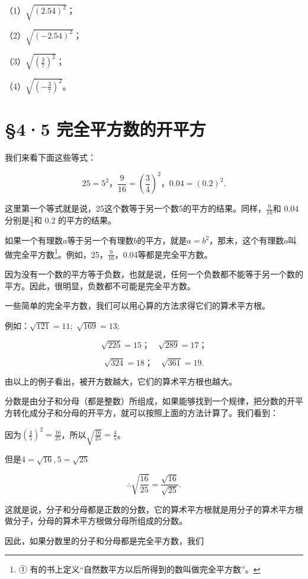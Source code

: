 （1）\(\sqrt{(2.54)^2}\)；

（2）\(\sqrt{(-2.54)^2}\)；

（3）\(\sqrt{\left(\frac{3}{7}\right)^2}\)；

（4）\(\sqrt{\left(-\frac{3}{7}\right)^2}\)。

\section{§4·5 完全平方数的开平方}

我们来看下面这些等式：

\[
25 = 5 ^ {2}\text{，} \frac{9}{16} = \left(\frac{3}{4}\right) ^ {2}\text{，} 0.04 = (0.2) ^ {2}.
\]

这里第一个等式就是说，25这个数等于另一个数5的平方的结果。同样，\(\frac{9}{16}\)和
0.04 分别是\(\frac{3}{4}\)和 0.2 的平方的结果。

如果一个有理数\(a\)等于另一个有理数\(b\)的平方，就是\(a = b^2\)，那末，这个有理数\(a\)叫做完全平方数\footnote{①
  有的书上定义``自然数平方以后所得到的数叫做完全平方数''。}。例如，25，\(\frac{9}{16}\)，0.04等都是完全平方数。

因为没有一个数的平方等于负数，也就是说，任何一个负数都不能等于另一个数的平方。因此，很明显，负数都不可能是完全平方数。

一些简单的完全平方数，我们可以用心算的方法求得它们的算术平方根。

例如：\(\sqrt{121} = 11;\) \(\sqrt{169} = 13;\)

\[
\sqrt {225} = 15\text{；} \quad \sqrt {289} = 17\text{；}
\]

\[
\sqrt {324} = 18\text{；} \quad \sqrt {361} = 19.
\]

由以上的例子看出，被开方数越大，它们的算术平方根也越大。

分数是由分子和分母（都是整数）所组成，如果能够找到一个规律，把分数的开平方转化成分子和分母的开平方，就可以按照上面的方法计算了。我们看到：

因为\(\left(\frac{4}{5}\right)^2 = \frac{16}{25}\)，所以\(\sqrt{\frac{16}{25}} = \frac{4}{5}\)。

但是\(4 = \sqrt{16}, 5 = \sqrt{25}\)

\[
\therefore \sqrt {\frac{16}{25}} = \frac{\sqrt {16}}{\sqrt {25}}.
\]

这就是说，分子和分母都是正数的分数，它的算术平方根就是用分子的算术平方根做分子，分母的算术平方根做分母所组成的分数。

因此，如果分数里的分子和分母都是完全平方数，我们

